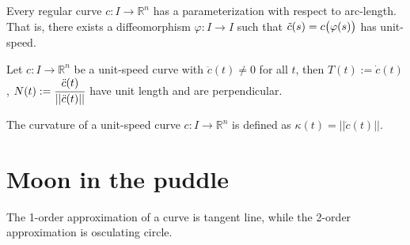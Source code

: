 \documentclass[10pt]{article}
\begin{document}
            \begin{proposition}
                Every regular curve $c: I\rightarrow\mathbb{R}^n$ has a parameterization with respect to arc-length. That is, there exists a diffeomorphism $\varphi: I\rightarrow I$ such that $\Tilde{c}(s) = c\big(\varphi(s)\big)$ has unit-speed.
            \end{proposition}
            \begin{theorem}
                Let $c: I\rightarrow\mathbb{R}^n$ be a unit-speed curve with $\ddot{c}(t)\neq 0$ for all $t$, then $T(t) := \dot{c}(t)$, $N(t) := \cfrac{\ddot{c}(t)}{||\ddot{c}(t)||}$ have unit length and are perpendicular.
            \end{theorem}
            \begin{definition}[Curvature]
                The curvature of a unit-speed curve $c: I\rightarrow\mathbb{R}^n$ is defined as $\kappa(t) = ||\ddot{c}(t)||$.
            \end{definition}


        \section{Moon in the puddle}
            The 1-order approximation of a curve is tangent line, while the 2-order approximation is osculating circle.
\end{document}
